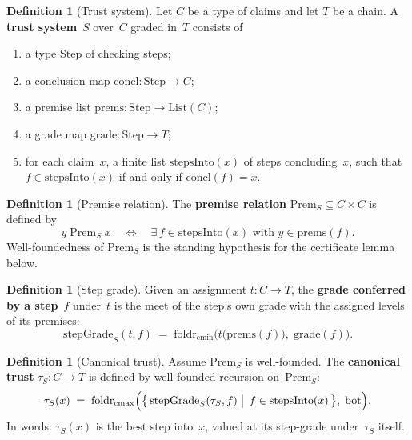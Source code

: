 \documentclass[11pt,a4paper]{article}
\theoremstyle{plain}
\theoremstyle{definition}
\newtheorem{definition}[theorem]{Definition}
\newcommand{\bott}{\mathrm{bot}}
\newcommand{\cmin}{\mathrm{cmin}}
\newcommand{\cmax}{\mathrm{cmax}}
\newcommand{\tauCan}{\tau}
\newcommand{\Prem}{\mathrm{Prem}}
\begin{document}
\begin{definition}[Trust system]\label{def:system}
Let $C$ be a type of claims and let $T$ be a chain. A \textbf{trust
system}~$S$ over~$C$ graded in~$T$ consists of
\begin{enumerate}
  \item a type $\mathrm{Step}$ of checking steps;
  \item a conclusion map $\mathrm{concl} : \mathrm{Step} \to C$;
  \item a premise list $\mathrm{prems} : \mathrm{Step} \to \mathrm{List}(C)$;
  \item a grade map $\mathrm{grade} : \mathrm{Step} \to T$;
  \item for each claim~$x$, a finite list $\mathrm{stepsInto}(x)$ of steps
        concluding~$x$, such that
        $f \in \mathrm{stepsInto}(x)$ if and only if $\mathrm{concl}(f) = x$.
\end{enumerate}
\end{definition}

\begin{definition}[Premise relation]\label{def:prem}
The \textbf{premise relation} $\Prem_S \subseteq C \times C$ is defined by
\[
  y \;\Prem_S\; x
  \quad\Longleftrightarrow\quad
  \exists\, f \in \mathrm{stepsInto}(x)
  \text{ with } y \in \mathrm{prems}(f).
\]
Well-foundedness of $\Prem_S$ is the standing hypothesis for the
certificate lemma below.
\end{definition}

\begin{definition}[Step grade]\label{def:stepgrade}
Given an assignment $t : C \to T$, the \textbf{grade conferred by a
step}~$f$ under~$t$ is the meet of the step's own grade with the assigned
levels of its premises:
\begin{equation}
  \mathrm{stepGrade}_S(t,f)
  \;=\;
  \mathrm{foldr}_{\cmin}\bigl(
    t\bigl(\mathrm{prems}(f)\bigr),\;
    \mathrm{grade}(f)
  \bigr).
\end{equation}
\end{definition}

\begin{definition}[Canonical trust]\label{def:tau}
Assume $\Prem_S$ is well-founded. The \textbf{canonical trust}
$\tauCan_S : C \to T$ is defined by well-founded recursion on~$\Prem_S$:
\begin{equation}
  \tauCan_S(x)
  \;=\;
  \mathrm{foldr}_{\cmax}\Bigl(
    \bigl\{\,
      \mathrm{stepGrade}_S(\tauCan_S, f)
      \bigm|\,
      f \in \mathrm{stepsInto}(x)
    \,\bigr\},\;
    \bott
  \Bigr).
\end{equation}
In words: $\tauCan_S(x)$ is the best step into~$x$, valued at its step-grade
under~$\tauCan_S$ itself.
\end{definition}
\end{document}
